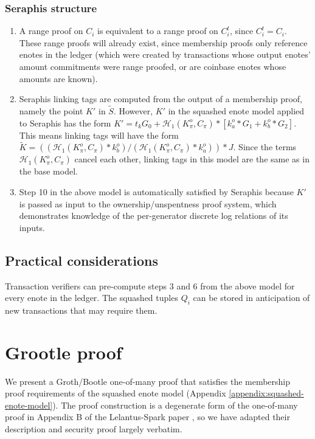 \begin{appendices}
\subsubsection{Seraphis structure}

\begin{enumerate}
    \item A range proof on $C_i$ is equivalent to a range proof on $C^t_i$, since $C^t_i = C_i$. These range proofs will already exist, since membership proofs only reference enotes in the ledger (which were created by transactions whose output enotes' amount commitments were range proofed, or are coinbase enotes whose amounts are known).

    \item Seraphis linking tags are computed from the output of a membership proof, namely the point $K'$ in $\tilde{S}$. However, $K'$ in the squashed enote model applied to Seraphis has the form $K' = t_k G_0 + \mathcal{H}_1(K^o_{\pi}, C_{\pi})*[k^o_a*G_1 + k^o_b*G_2]$. This means linking tags will have the form $\tilde{K} = ((\mathcal{H}_1(K^o_{\pi}, C_{\pi})*k^o_b)/(\mathcal{H}_1(K^o_{\pi}, C_{\pi})*k^o_a))*J$. Since the terms $\mathcal{H}_1(K^o_{\pi}, C_{\pi})$ cancel each other, linking tags in this model are the same as in the base model.

    \item Step 10 in the above model is automatically satisfied by Seraphis because $K'$ is passed as input to the ownership/unspentness proof system, which demonstrates knowledge of the per-generator discrete log relations of its inputs.
\end{enumerate}


\subsection{Practical considerations}
\label{appendix:squashed-enote-model-practical-considerations}

Transaction verifiers can pre-compute steps 3 and 6 from the above model for every enote in the ledger. The squashed tuples $Q_i$ can be stored in anticipation of new transactions that may require them.



\section{Grootle proof}
\label{appendix:grootle-proof}

We present a Groth/Bootle one-of-many proof \cite{groth-one-out-of-many, bootle-one-of-many} that satisfies the membership proof requirements of the squashed enote model (Appendix \ref{appendix:squashed-enote-model}). The proof construction is a degenerate form of the one-of-many proof in Appendix B of the Lelantus-Spark paper \cite{lelantus-spark}, so we have adapted their description and security proof largely verbatim.



\end{appendices}
